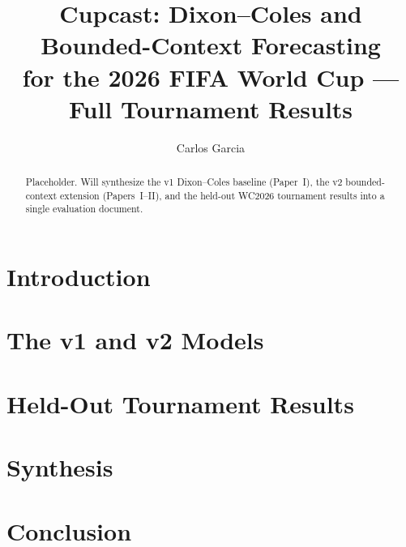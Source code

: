 \documentclass[11pt]{article}
\title{Cupcast: Dixon--Coles and Bounded-Context Forecasting\\
       for the 2026 FIFA World Cup --- Full Tournament Results}
\author{Carlos Garcia}
\date{}
\begin{document}
\maketitle

\begin{abstract}
Placeholder. Will synthesize the v1 Dixon--Coles baseline (Paper~I),
the v2 bounded-context extension (Papers~I--II), and the held-out
WC2026 tournament results into a single evaluation document.
\end{abstract}

\section{Introduction}
\label{sec:intro}

\section{The v1 and v2 Models}
\label{sec:models}

\section{Held-Out Tournament Results}
\label{sec:results}

\section{Synthesis}
\label{sec:synthesis}

\section{Conclusion}
\label{sec:conclusion}
\end{document}
